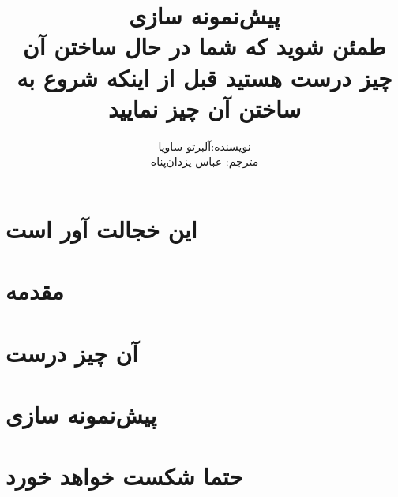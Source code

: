 \documentclass[a5paper,14pt]{book}
\author{نویسنده:آلبرتو ساویا
\\ مترجم: عباس یزدان‌پناه}
\title{پیش‌نمونه سازی
\\
طمئن شوید که شما در حال ساختن  آن چیز درست هستید قبل از اینکه شروع به ساختن آن چیز نمایید}
\begin{document}
\maketitle
\frontmatter
\tableofcontents

\chapter{این خجالت آور است}

\chapter{مقدمه}

\mainmatter
\chapter{آن چیز درست}

\chapter{پیش‌نمونه سازی}

\chapter{حتما شکست خواهد خورد}

\end{document}
